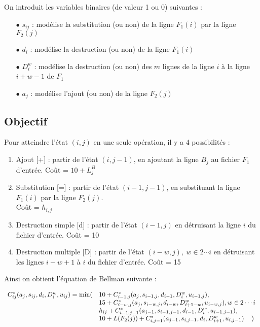 \documentclass[a4paper, 10pt, french]{article}
\begin{document}
On introduit les variables binaires (de valeur 1 ou 0) suivantes :
\\

\begin{itemize}
\item[$\bullet$]
$s_{ij}$ : modélise la substitution (ou non) de la ligne $F_1(i)$ par la ligne $F_2(j)$
\\
\item[$\bullet$]
$d_i$ : modélise la destruction (ou non) de la ligne $F_1(i)$
\\
\item[$\bullet$]
$D_i^w$ : modélise la destruction (ou non) des $m$ lignes de la ligne $i$ à la ligne $i+w-1$ de $F_1$
\\
\item[$\bullet$]
$a_j$ : modélise l'ajout (ou non) de la ligne $F_2(j)$
\end{itemize}
\vspace{3mm}


\subsection*{Objectif}

Pour atteindre l'état $(i,j)$ en une seule opération, il y a 4 possibilités :
\begin{enumerate}
\item Ajout [+] : partir de l'état $(i,j-1)$, en ajoutant la ligne $B_j$ au fichier $F_1$ d'entrée. Coût = $10 + L_{j}^B$

\item Substitution [=] : partir de l'état $(i-1,j-1)$, en substituant la ligne $F_1(i)$ par la ligne $F_2(j)$.\\
Coût = $h_{i,j}$

\item Destruction simple [d] : partir de l'état $(i-1,j)$ en détruisant la ligne $i$ du fichier d'entrée. Coût = 10

\item Destruction multiple [D] : partir de l'état $(i-w,j),\ w \in 2 \cdots i$ en détruisant les lignes $i-w+1$ à $i$ du fichier d'entrée. Coût = 15
\end{enumerate}
\vspace{3mm}

Ainsi on obtient l'équation de Bellman suivante :

$$\begin{array}{rll}
C^*_{ij}(a_{j},s_{ij},d_{i},D_{i}^w, u_{ij}) = \min (
& 10 + C^*_{i-1,j}(a_{j},s_{i-1,j},d_{i-1},D_{i}^w, u_{i-1,j}),\\
& 15 + C^*_{i-w,j}(a_{j},s_{i-w,j},d_{i-w},D_{i+1-w}^w, u_{i-w,j}), w \in 2 \cdots i\\
& h_{ij} + C^*_{i-1,j-1}(a_{j-1},s_{i-1,j-1},d_{i-1},D_{i}^w, u_{i-1,j-1}),\\
& 10 + L(F_2(j)) + C^*_{i,j-1}(a_{j-1},s_{i,j-1},d_{i},D_{i+1}^w, u_{i,j-1}) \hspace{4mm} )
\end{array}$$

\end{document}
